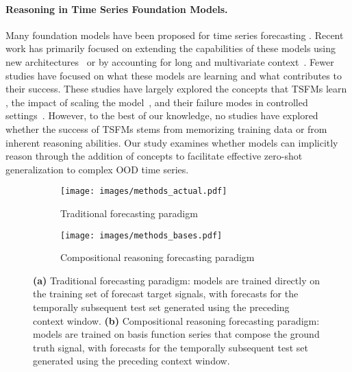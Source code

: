\paragraph{Reasoning in Time Series Foundation Models.} 
Many foundation models have been proposed for time series forecasting \citep{wolff2024spade, ansari2024chronos, gao2024units, rasul2024lagllama, moirai2024, goswami2024moment, das2024TimesFM, garza2023timegpt1, liutimer, ekambaram2024ttms}. Recent work has primarily focused on extending the capabilities of these models using new architectures~\citep{moiraimoe, timemoe} or by accounting for long and multivariate context~\citep{infinichannelmixer, timerxl}. Fewer studies have focused on what these models are learning and what contributes to their success. These studies have largely explored the concepts that TSFMs learn \citep{wilinski2024exploring, goswami2024moment}, the impact of scaling the model~\citep{yao2024scaling, edwards2024scaling}, and their failure modes in controlled settings~\citep{aws2024chronos}. However, to the best of our knowledge, no studies have explored whether the success of TSFMs stems from memorizing training data or from inherent reasoning abilities. Our study examines whether models can implicitly reason through the addition of concepts to facilitate effective zero-shot generalization to complex OOD time series.

\begin{figure*}[ht]
    \centering
    \begin{subfigure}[b]{0.49\textwidth}
        \centering
        \texttt{[image: images/methods\_actual.pdf]}
        \caption{Traditional forecasting paradigm
        }
        \label{fig:methods_general}
    \end{subfigure}
    \hfill
    \begin{subfigure}[b]{0.49\textwidth}
        \centering
        \texttt{[image: images/methods\_bases.pdf]}
        \caption{Compositional reasoning forecasting paradigm}
        \label{fig:comparison}
    \end{subfigure}
    \caption{\textbf{(a)} Traditional forecasting paradigm: models are trained directly on the training set of forecast target signals, with forecasts for the temporally subsequent test set generated using the preceding context window. \textbf{(b)} Compositional reasoning forecasting paradigm: models are trained on basis function series that compose the ground truth signal, with forecasts for the temporally subsequent test set generated using the preceding context window.}
    \label{fig:method_compositional}
\end{figure*}

